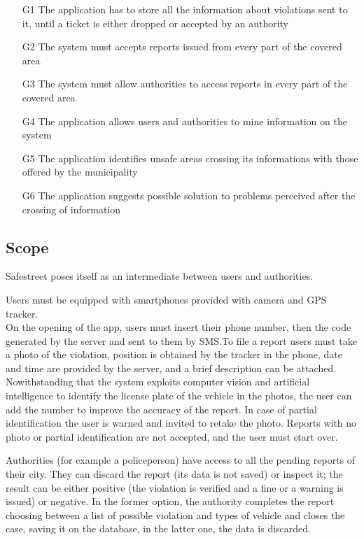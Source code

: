 \begin{itemize}


\item [G1]{The application has to store all the information about violations sent to it, until a ticket is either dropped or accepted by an authority}

\item [G2]{The system must accepts reports issued from every part of the covered area }

\item [G3]{The system must allow authorities to access reports in every part of the covered area}

\item [G4]{The application allows users and authorities to mine information on the system}

\item [G5]{The application identifies unsafe areas crossing its informations with those offered by the municipality}

\item [G6]{The application suggests possible solution to problems perceived after the crossing of information}

\end{itemize}

\subsection{Scope}

Safestreet poses itself as an intermediate between users and authorities.

Users must be equipped with smartphones provided with camera and GPS tracker.\\
On the opening of the app, users must insert their phone number, then the code generated by the server and sent to them by SMS.To file a report users must take a photo of the violation, position is obtained by the tracker in the phone, date and time are provided by the server, and a brief description can be attached. Nowithstanding that the system exploits computer vision and artificial intelligence to identify the license plate of the vehicle in the photos, the user can add the number to improve the accuracy of the report. In case of partial identification the user is warned and invited to retake the photo. Reports with no photo or partial identification are not accepted, and the user must start over.

Authorities (for example a policeperson) have access to all the pending reports of their city. They can discard the report (its data is not saved) or inspect it; the result can be either positive (the violation is verified and a fine or a warning is issued) or negative. In the former option, the authority completes the report choosing between a list of possible violation and types of vehicle and closes the case, saving it on the database, in the latter one, the data is discarded.\\

